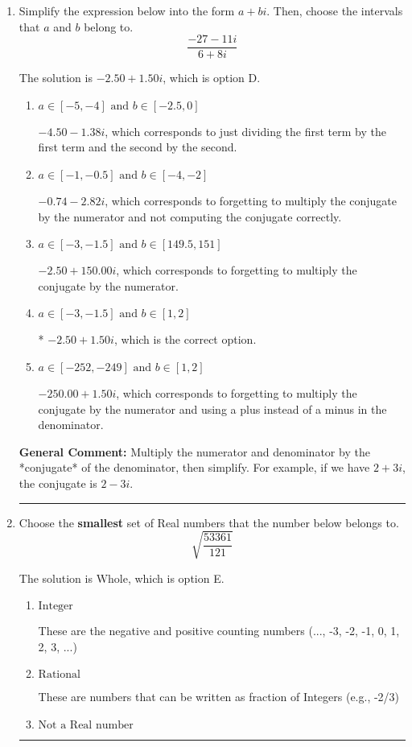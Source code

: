 \documentclass{extbook}[14pt]
\newcommand{\litem}[1]{\item #1

\rule{\textwidth}{0.4pt}}
\begin{document}
\begin{enumerate}\litem{
Simplify the expression below into the form $a+bi$. Then, choose the intervals that $a$ and $b$ belong to.
\[ \frac{-27 - 11 i}{6 + 8 i} \]

The solution is \( -2.50  + 1.50 i \), which is option D.\begin{enumerate}[label=\Alph*.]
\item \( a \in [-5, -4] \text{ and } b \in [-2.5, 0] \)

 $-4.50  - 1.38 i$, which corresponds to just dividing the first term by the first term and the second by the second.
\item \( a \in [-1, -0.5] \text{ and } b \in [-4, -2] \)

 $-0.74  - 2.82 i$, which corresponds to forgetting to multiply the conjugate by the numerator and not computing the conjugate correctly.
\item \( a \in [-3, -1.5] \text{ and } b \in [149.5, 151] \)

 $-2.50  + 150.00 i$, which corresponds to forgetting to multiply the conjugate by the numerator.
\item \( a \in [-3, -1.5] \text{ and } b \in [1, 2] \)

* $-2.50  + 1.50 i$, which is the correct option.
\item \( a \in [-252, -249] \text{ and } b \in [1, 2] \)

 $-250.00  + 1.50 i$, which corresponds to forgetting to multiply the conjugate by the numerator and using a plus instead of a minus in the denominator.
\end{enumerate}

\textbf{General Comment:} Multiply the numerator and denominator by the *conjugate* of the denominator, then simplify. For example, if we have $2+3i$, the conjugate is $2-3i$.
}
\litem{
Choose the \textbf{smallest} set of Real numbers that the number below belongs to.
\[ \sqrt{\frac{53361}{121}} \]

The solution is \( \text{Whole} \), which is option E.\begin{enumerate}[label=\Alph*.]
\item \( \text{Integer} \)

These are the negative and positive counting numbers (..., -3, -2, -1, 0, 1, 2, 3, ...)
\item \( \text{Rational} \)

These are numbers that can be written as fraction of Integers (e.g., -2/3)
\item \( \text{Not a Real number} \)


\end{enumerate}}
\end{enumerate}
\end{document}
